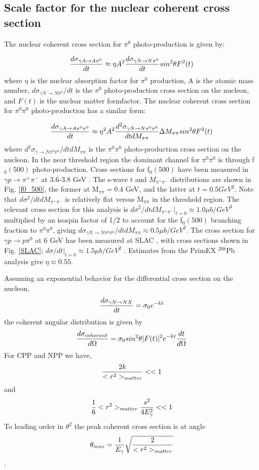  \subsection{Scale factor for the nuclear coherent cross section}

The nuclear coherent cross section for  $\pi^0$ photo-production is given by: 

$$ {d\sigma_{\gamma A \rightarrow A  \pi^0 } \over dt } \approx \eta A^2 { d\sigma_{\gamma N \rightarrow N \pi^0 } \over dt }sin^2 \theta F^2(t) $$
where $\eta$ is the nuclear absorption factor for $\pi^0$ production, A is the atomic mass number, $d\sigma_{\gamma N \rightarrow N\pi^0 } / dt$ is the $\pi^0$ photo-production cross section on the nucleon, and $F(t)$ is the nuclear matter formfactor.  The nuclear coherent cross section for  $\pi^0 \pi^0$ photo-production has a similar form: 

$$ {d\sigma_{\gamma A \rightarrow A  \pi^0 \pi^0} \over dt } \approx  \eta^2 A^2 { d^2 \sigma_{\gamma N \rightarrow N \pi^0 \pi^0} \over dt dM_{\pi \pi}}\Delta M_{\pi \pi} sin^2 \theta F^2(t) $$
where $d^2\sigma_{\gamma \rightarrow N\pi^0 \pi^0} / dt dM_{\pi \pi}$ is the $\pi^0 \pi^0$ photo-production cross section on the nucleon.
  In the near threshold region the dominant channel for $\pi^0 \pi^0$ is through f$_0(500)$ photo-production.    Cross sections for f$_0(500)$   have been measured in 
  $\gamma p \rightarrow \pi^+ \pi^-$ at 3.6-3.8 GeV \cite{Battaglieri:2009aa}.   The s-wave t and $M_{\pi^+ \pi^-}$ distributions are shown in Fig. \ref{f0_500}, the former at M$_{\pi \pi}=0.4$ GeV, and the latter at $t=0.5 GeV^2$.  Note that  
  $d\sigma^2 / dt dM_{\pi^+ \pi^-}$ is relatively flat versus M$_{\pi \pi}$ in the threshold region. The relevant cross section for this analysis is $d\sigma^2 / dt dM_{\pi^+ \pi^-}|_{ t = 0} \approx 1.0 \mu b/GeV^3$  multiplied by an isospin factor of 1/2 to account for the f$_0(500)$ branching fraction to $\pi^0 \pi^0$, giving $d \sigma_{\gamma N \rightarrow N \pi^0 \pi^0} / dt dM_{\pi \pi} \approx 0.5 \mu b / GeV^2 $. The cross section for  $\gamma p \rightarrow  p \pi^0$ at 6 GeV has been measured at SLAC \cite{Anderson:1971}, with cross sections shown in Fig. \ref{SLAC};   $d\sigma / dt|_{t=0} \approx 1.5 \mu b/GeV^2$ .   Estimates from the PrimEX $^{208}$Pb analysis give $\eta \approx 0.55$.  
  
  Assuming an exponential behavior for the differential cross section on the nucleon, 
  $$ {d\sigma_{\gamma N \rightarrow N X} \over dt} = \sigma_0 e^{-kt}$$
  the coherent angular distribution is given by
  $$ { d\sigma_{coherent} \over d\Omega} = \sigma_0 sin^2 \theta |F(t)|^2 e^{-kt} {dt \over d\Omega}$$ 
  For CPP and NPP we have, 
  $$ {2k \over <r^2>_{matter}}<<1 $$
  and 
  $${1 \over 6}<r^2>_{matter} {s^2 \over 4E^2_\gamma}<<1$$
   To leading order in $\theta^2$ the peak coherent cross section is at angle 
$$ \theta_{max}={1 \over E_\gamma}\sqrt{ 2 
 \over <r^2>_{matter} } $$
 . 
 

